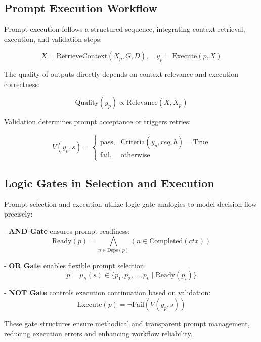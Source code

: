 \documentclass[11pt,a4paper]{article}
\begin{document}
\subsection{Prompt Execution Workflow}
\label{subsec:execution_workflow}

Prompt execution follows a structured sequence, integrating context retrieval, execution, and validation steps:

\[
X = \text{RetrieveContext}(X_p, G, D), \quad y_p = \text{Execute}(p, X)
\]

The quality of outputs directly depends on context relevance and execution correctness:

\[
\text{Quality}(y_p) \propto \text{Relevance}(X, X_p)
\]

Validation determines prompt acceptance or triggers retries:

\[
V(y_p, s) =
\begin{cases}
    \text{pass}, & \text{Criteria}(y_p, req, h)=\text{True}\\[4pt]
    \text{fail}, & \text{otherwise}
\end{cases}
\]

\subsection{Logic Gates in Selection and Execution}
\label{subsec:execution_gates}

Prompt selection and execution utilize logic-gate analogies to model decision flow precisely:

- \textbf{AND Gate} ensures prompt readiness:
\[
\text{Ready}(p) = \bigwedge_{n \in \text{Deps}(p)} (n \in \text{Completed}(ctx))
\]

- \textbf{OR Gate} enables flexible prompt selection:
\[
p = \mu_h(s) \in \{ p_1, p_2, \dots, p_k \mid \text{Ready}(p_i) \}
\]

- \textbf{NOT Gate} controls execution continuation based on validation:
\[
\text{Execute}(p) = \neg\text{Fail}(V(y_p, s))
\]

These gate structures ensure methodical and transparent prompt management, reducing execution errors and enhancing workflow reliability.

\end{document}

